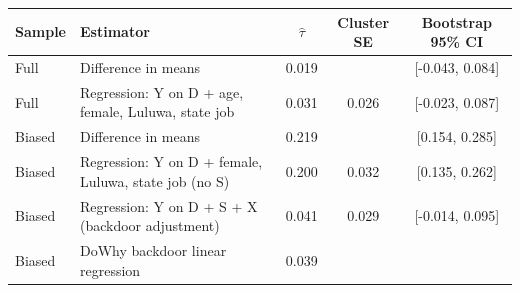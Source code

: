 \begin{tabular}{llccc}
\toprule
Sample & Estimator & $\hat\tau$ & Cluster SE & Bootstrap 95\% CI\\
\midrule
Full & Difference in means & 0.019 &  & [-0.043, 0.084]\\
Full & Regression: Y on D + age, female, Luluwa, state job & 0.031 & 0.026 & [-0.023, 0.087]\\
Biased & Difference in means & 0.219 &  & [0.154, 0.285]\\
Biased & Regression: Y on D + female, Luluwa, state job (no S) & 0.200 & 0.032 & [0.135, 0.262]\\
Biased & Regression: Y on D + S + X (backdoor adjustment) & 0.041 & 0.029 & [-0.014, 0.095]\\
Biased & DoWhy backdoor linear regression & 0.039 & & \\
\bottomrule
\end{tabular}
